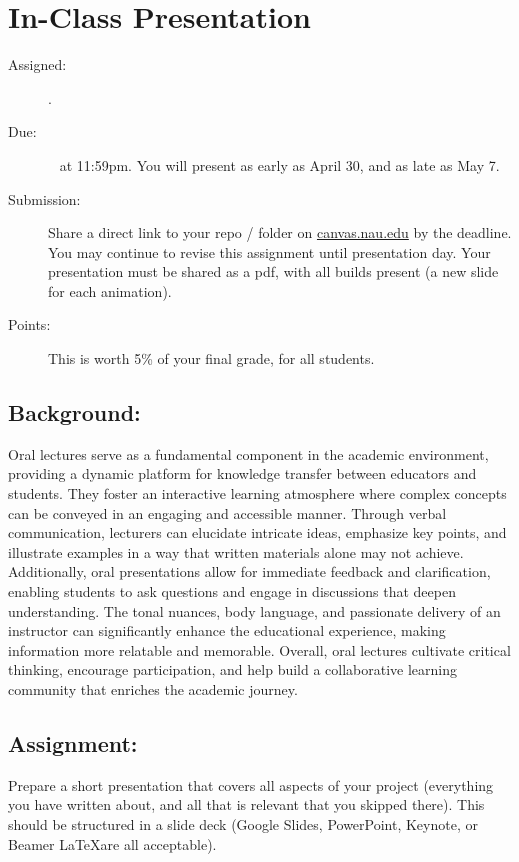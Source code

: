 \documentclass[11pt]{article}
\begin{document}
\section{In-Class Presentation}
\begin{description}
	\item [Assigned:] \wkFourteenTu. %
	\item [Due:] \wkFifteenTu~ at 11:59pm. You will present as early as April 30, and as late as May 7.
	\item [Submission:] Share a direct link to your repo / folder on \href{https://canvas.nau.edu}{canvas.nau.edu} by the deadline. You may continue to revise this assignment until presentation day.  Your presentation must be shared as a pdf, with all builds present (a new slide for each animation).
	\item [Points:] This is worth 5\% of your final grade, for all students.
\end{description}

\subsection*{Background:}
Oral lectures serve as a fundamental component in the academic environment, providing a dynamic platform for knowledge transfer between educators and students. They foster an interactive learning atmosphere where complex concepts can be conveyed in an engaging and accessible manner. Through verbal communication, lecturers can elucidate intricate ideas, emphasize key points, and illustrate examples in a way that written materials alone may not achieve. Additionally, oral presentations allow for immediate feedback and clarification, enabling students to ask questions and engage in discussions that deepen understanding. The tonal nuances, body language, and passionate delivery of an instructor can significantly enhance the educational experience, making information more relatable and memorable. Overall, oral lectures cultivate critical thinking, encourage participation, and help build a collaborative learning community that enriches the academic journey.

\subsection*{Assignment:}
Prepare a short presentation that covers all aspects of your project (everything you have written about, and all that is relevant that you skipped there).  This should be structured in a slide deck (Google Slides, PowerPoint, Keynote, or Beamer \LaTeX are all acceptable).
\end{document}
